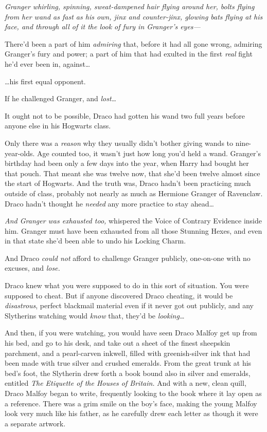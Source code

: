 \emph{Granger whirling, spinning, sweat-dampened hair flying around her,
bolts flying from her wand as fast as his own, jinx and counter-jinx,
glowing bats flying at his face, and through all of it the look of fury
in Granger's eyes---}

There'd been a part of him \emph{admiring} that, before it had all gone
wrong, admiring Granger's fury and power; a part of him that had exulted
in the first \emph{real} fight he'd ever been in, against\ldots{}

\ldots{}his first equal opponent.

If he challenged Granger, and \emph{lost\ldots{}}

It ought not to be possible, Draco had gotten his wand two full years
before anyone else in his Hogwarts class.

Only there was a \emph{reason} why they usually didn't bother giving
wands to nine-year-olds. Age counted too, it wasn't just how long you'd
held a wand. Granger's birthday had been only a few days into the year,
when Harry had bought her that pouch. That meant she was twelve now,
that she'd been twelve almost since the start of Hogwarts. And the truth
was, Draco hadn't been practicing much outside of class, probably not
nearly as much as Hermione Granger of Ravenclaw. Draco hadn't thought he
\emph{needed} any more practice to stay ahead\ldots{}

\emph{And Granger was exhausted too,} whispered the Voice of Contrary
Evidence inside him. Granger must have been exhausted from all those
Stunning Hexes, and even in that state she'd been able to undo his
Locking Charm.

And Draco \emph{could not} afford to challenge Granger publicly,
one-on-one with no excuses, and \emph{lose.}

Draco knew what you were supposed to do in this sort of situation. You
were supposed to cheat. But if anyone discovered Draco cheating, it
would be \emph{disastrous}, perfect blackmail material even if it never
got out publicly, and any Slytherins watching would \emph{know} that,
they'd be \emph{looking\ldots{}}

And then, if you were watching, you would have seen Draco Malfoy get up
from his bed, and go to his desk, and take out a sheet of the finest
sheepskin parchment, and a pearl-carven inkwell, filled with
greenish-silver ink that had been made with true silver and crushed
emeralds. From the great trunk at his bed's foot, the Slytherin drew
forth a book bound also in silver and emeralds, entitled \emph{The
Etiquette of the Houses of Britain.} And with a new, clean quill, Draco
Malfoy began to write, frequently looking to the book where it lay open
as a reference. There was a grim smile on the boy's face, making the
young Malfoy look very much like his father, as he carefully drew each
letter as though it were a separate artwork.

